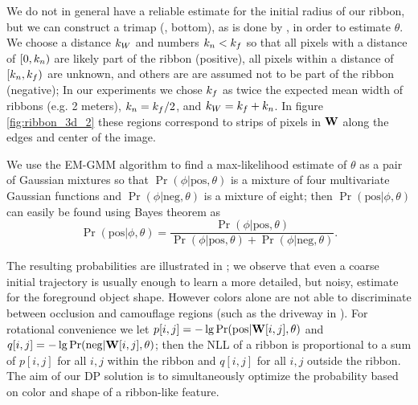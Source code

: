 We do not in general have a reliable estimate for the initial radius of our ribbon, 
but we can construct a trimap (, bottom), as is done by \GrabCut{}, in order to estimate $\theta$. We choose a distance $k_W$ and numbers $k_n < k_f$ 
so that all pixels with a distance of $[0, k_n)$ are likely part of the ribbon (positive), all pixels within a distance of $[k_n, k_f)$ are unknown, and others are are assumed not to be part of the ribbon (negative); 
In our experiments we chose  $k_f$ as twice the expected mean width of ribbons (e.g. 2 meters), $k_n = k_f/2$, and $k_W=k_f+k_n$.  
In figure \ref{fig:ribbon_3d_2} these regions correspond to strips of pixels in $\mathbf{W}{}$ along the edges and center of the image.


We use the EM-GMM algorithm to find a max-likelihood estimate of $\theta$ as a pair of Gaussian mixtures so that $\Pr(\phi|\text{pos}, \theta)$ is a mixture of four multivariate Gaussian functions and $\Pr(\phi|\text{neg}, \theta)$ is a mixture of eight; then $\Pr(\text{pos}|\phi, \theta)$ can easily be found using Bayes theorem as 
$$\Pr(\text{pos}|\phi, \theta)= \frac{\Pr(\phi|\text{pos}, \theta)}{\Pr(\phi|\text{pos}, \theta)+\Pr(\phi|\text{neg}, \theta)}.$$




The resulting probabilities are illustrated in ; we observe that even a coarse initial trajectory is usually enough to learn a more detailed, but noisy, estimate for the foreground object shape. However colors alone are not able to discriminate between occlusion and camouflage regions (such as the driveway in ). For rotational convenience we let $p[i,j]=-\lg \Pr(\text{pos}|\mathbf{W}{}[i,j], \theta)$ and $q[i,j]=-\lg \Pr(\text{neg}|\mathbf{W}{}[i,j], \theta)$; then the \ac{NLL} of a ribbon is proportional to a sum of $p[i,j]$ for all $i,j$ within the ribbon and $q[i,j]$ for all $i,j$ outside the ribbon. The aim of our \ac{DP} solution is to simultaneously optimize the probability based on color and shape of a ribbon-like feature. 


